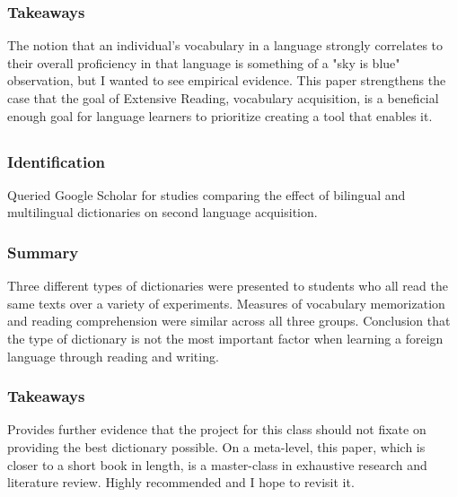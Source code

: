 \documentclass[
	letterpaper, %
]{jdf}
\begin{document}
\subsubsection{Takeaways}
The notion that an individual's vocabulary in a language strongly correlates to their overall proficiency in that language is something of a "sky is blue" observation, but I wanted to see empirical evidence. This paper strengthens the case that the goal of Extensive Reading, vocabulary acquisition, is a beneficial enough goal for language learners to prioritize creating a tool that enables it.

\subsection{}
\subsubsection{Identification}
Queried Google Scholar for studies comparing the effect of bilingual and multilingual dictionaries on second language acquisition.

\subsubsection{Summary}
Three different types of dictionaries were presented to students who all read the same texts over a variety of experiments. Measures of vocabulary memorization and reading comprehension were similar across all three groups. Conclusion that the type of dictionary is not the most important factor when learning a foreign language through reading and writing.

\subsubsection{Takeaways}
Provides further evidence that the project for this class should not fixate on providing the best dictionary possible. On a meta-level, this paper, which is closer to a short book in length, is a master-class in exhaustive research and literature review. Highly recommended and I hope to revisit it.
\end{document}
